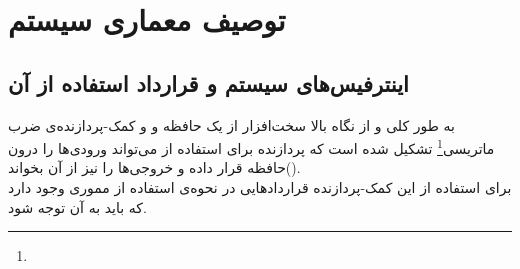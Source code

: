 \documentclass[12pt,onecolumn,a4paper,fleqn]{article}
\begin{document}
\pagebreak

\section{توصیف معماری سیستم}
\subsection{اینترفیس‌های سیستم و قرارداد استفاده از آن }
به طور کلی  و از نگاه بالا سخت‌افزار از یک حافظه و و کمک-پردازنده‌ی ضرب ماتریسی\footnote{} تشکیل شده است که پردازنده برای استفاده از‌ می‌تواند ورودی‌ها را درون حافظه قرار داده و خروجی‌ها را نیز از آن بخواند(). 
\\ برای استفاده از این  کمک-پردازنده قرارداد‌هایی در نحوه‌ی استفاده از مموری وجود دارد که باید به آن توجه شود.
\end{document}
